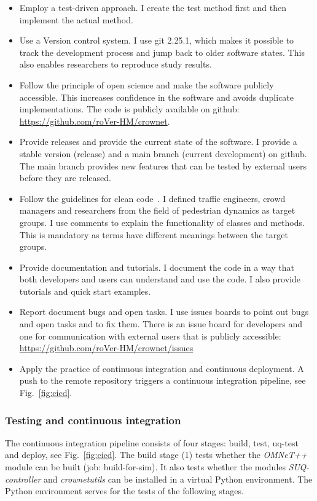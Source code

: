 \begin{itemize}
\item Employ a test-driven approach. I create the test method first and then implement the actual method.
\item Use a Version control system. I use git 2.25.1, which makes it possible to track the development process and jump back to older software states. This also enables researchers to reproduce study results.
\item Follow the principle of open science and make the software publicly accessible. This increases confidence in the software and avoids duplicate implementations. The code is publicly available on github: \url{https://github.com/roVer-HM/crownet}.
\item Provide releases and provide the current state of the software. I provide a stable version (release) and a main branch (current development) on github. The main branch provides new features that can be tested by external users before they are released. 
\item Follow the guidelines for clean code~\cite{martin-2008-cs}. I defined traffic engineers, crowd managers and researchers from the field of pedestrian dynamics as target groups. I use comments to explain the functionality of  classes and methods. This is mandatory as terms have different meanings between the target groups.
\item Provide documentation and tutorials. I document the code in a way that both developers and users can understand and use the code. I also provide tutorials and quick start examples.
\item Report document bugs and open tasks. I use issues boards to point out bugs and open tasks and to fix them. There is an issue board for developers and one for communication with external users that is publicly accessible: \url{https://github.com/roVer-HM/crownet/issues}
\item Apply the practice of continuous integration and continuous deployment. A push to the remote repository triggers a continuous integration pipeline, see Fig.~\ref{fig:cicd}.
\end{itemize}

\subsubsection{Testing and continuous integration}


The continuous integration pipeline consists of four stages: build, test, uq-test and deploy, see Fig.~\ref{fig:cicd}.
The build stage (1) tests whether the \textit{OMNeT++} module can be built (job: build-for-sim). It also tests whether the modules \textit{SUQ-controller} and \textit{crownetutils} can be installed in a virtual Python environment. The Python environment serves for the tests  of the following stages.

